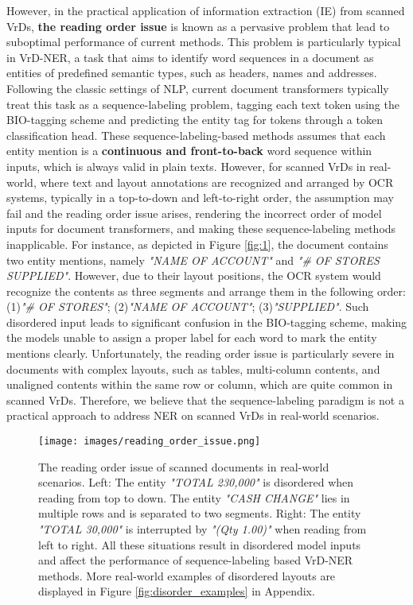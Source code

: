 \documentclass[11pt]{article}
\begin{document}
However, in the practical application of information extraction (IE) from scanned VrDs, \textbf{the reading order issue} is known as a pervasive problem that lead to suboptimal performance of current methods.
This problem is particularly typical in VrD-NER, a task that aims to identify word sequences in a document as entities of predefined semantic types, such as headers, names and addresses.
Following the classic settings of NLP, current document transformers typically treat this task as a sequence-labeling problem, tagging each text token using the BIO-tagging scheme \citep{ramshaw1999text} and predicting the entity tag for tokens through a token classification head.
These sequence-labeling-based methods assumes that each entity mention is a \textbf{continuous and front-to-back} word sequence within inputs, which is always valid in plain texts.  
However, for scanned VrDs in real-world, where text and layout annotations are recognized and arranged by OCR systems, typically in a top-to-down and left-to-right order, the assumption may fail and the reading order issue arises, rendering the incorrect order of model inputs for document transformers, and making these sequence-labeling methods inapplicable.
For instance, as depicted in Figure \ref{fig:1}, the document contains two entity mentions, namely {\footnotesize \textit{"NAME OF ACCOUNT"}} and {\footnotesize \textit{"\# OF STORES SUPPLIED"}}.
However, due to their layout positions, the OCR system would recognize the contents as three segments and arrange them in the following order:(1){\footnotesize \textit{"\# OF STORES"}}; (2){\footnotesize \textit{"NAME OF ACCOUNT"}}; (3){\footnotesize \textit{"SUPPLIED"}}. 
Such disordered input leads to significant confusion in the BIO-tagging scheme, making the models unable to assign a proper label for each word to mark the entity mentions clearly.
Unfortunately, the reading order issue is particularly severe in documents with complex layouts, such as tables, multi-column contents, and unaligned contents within the same row or column, which are quite common in scanned VrDs. 
Therefore, we believe that the sequence-labeling paradigm is not a practical approach to address NER on scanned VrDs in real-world scenarios. 

\begin{figure}[t]
    \centering
    \texttt{[image: images/reading\_order\_issue.png]}        
    \caption{
        The reading order issue of scanned documents in real-world scenarios. 
        Left: 
        The entity {\footnotesize \textit{"TOTAL 230,000"}} is disordered when reading from top to down. 
        The entity {\footnotesize \textit{"CASH CHANGE"}} lies in multiple rows and is separated to two segments. 
        Right:
        The entity {\footnotesize \textit{"TOTAL 30,000"}} is interrupted by {\footnotesize \textit{"(Qty 1.00)"}} when reading from left to right.
        All these situations result in disordered model inputs and affect the performance of sequence-labeling based VrD-NER methods. 
        More real-world examples of disordered layouts are displayed in Figure \ref{fig:disorder_examples} in Appendix. 
        }
\label{fig:reading_order_issue}
\end{figure}
\end{document}

